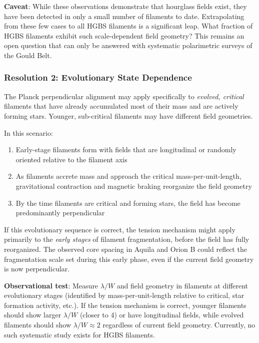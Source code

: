\documentclass[11pt,a4paper]{article}
\begin{document}
\textbf{Caveat}: While these observations demonstrate that hourglass fields exist, they have been detected in only a small number of filaments to date. Extrapolating from these few cases to all HGBS filaments is a significant leap. What fraction of HGBS filaments exhibit such scale-dependent field geometry? This remains an open question that can only be answered with systematic polarimetric surveys of the Gould Belt.

\subsubsection{Resolution 2: Evolutionary State Dependence}

The Planck perpendicular alignment may apply specifically to \emph{evolved, critical} filaments that have already accumulated most of their mass and are actively forming stars. Younger, sub-critical filaments may have different field geometries.

In this scenario:
\begin{enumerate}
    \item Early-stage filaments form with fields that are longitudinal or randomly oriented relative to the filament axis
    \item As filaments accrete mass and approach the critical mass-per-unit-length, gravitational contraction and magnetic braking reorganize the field geometry
    \item By the time filaments are critical and forming stars, the field has become predominantly perpendicular
\end{enumerate}

If this evolutionary sequence is correct, the tension mechanism might apply primarily to the \emph{early stages} of filament fragmentation, before the field has fully reorganized. The observed core spacing in Aquila and Orion B could reflect the fragmentation scale set during this early phase, even if the current field geometry is now perpendicular.

\textbf{Observational test}: Measure $\lambda/W$ and field geometry in filaments at different evolutionary stages (identified by mass-per-unit-length relative to critical, star formation activity, etc.). If the tension mechanism is correct, younger filaments should show larger $\lambda/W$ (closer to 4) or have longitudinal fields, while evolved filaments should show $\lambda/W \approx 2$ regardless of current field geometry. Currently, no such systematic study exists for HGBS filaments.
\end{document}
